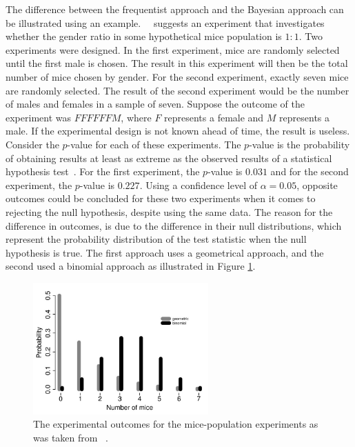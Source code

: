 The difference between the frequentist approach and the Bayesian approach can be illustrated using an example.~\citeauthor{ref:hackenberger:2019}~\cite{ref:hackenberger:2019} suggests an experiment that investigates whether the gender ratio in some hypothetical mice population is $1:1$. Two experiments were designed. In the first experiment, mice are randomly selected until the first male is chosen. The result in this experiment will then be the total number of mice chosen by gender. For the second experiment, exactly seven mice are randomly selected. The result of the second experiment would be the number of males and females in a sample of seven. Suppose the outcome of the experiment was $FFFFFFM$, where $F$ represents a female and $M$ represents a male. If the experimental design is not known ahead of time, the result is useless. Consider the $p$-value for each of these experiments. The $p$-value is the probability of obtaining results at least as extreme as the observed results of a statistical hypothesis test~\cite{ref:beers:2022}. For the first experiment, the $p$-value is $0.031$ and for the second experiment, the $p$-value is $0.227$. Using a confidence level of $\alpha = 0.05$, opposite outcomes could be concluded for these two experiments when it comes to rejecting the null hypothesis, despite using the same data. The reason for the difference in outcomes, is due to the difference in their null distributions, which represent the probability distribution of the test statistic when the null hypothesis is true. The first approach uses a geometrical approach, and the second used a binomial approach as illustrated in Figure \ref{fig:probability:bayesian_statistics:mouse_experiment_outcome}.

\begin{figure}[htb]
      \centering
      \includegraphics[width=0.6\textwidth]{images/mouse_experiment_outcome.pdf}
      \caption{The experimental outcomes for the mice-population experiments as was taken from~\cite{ref:hackenberger:2019} .}
      \label{fig:probability:bayesian_statistics:mouse_experiment_outcome}
\end{figure}

